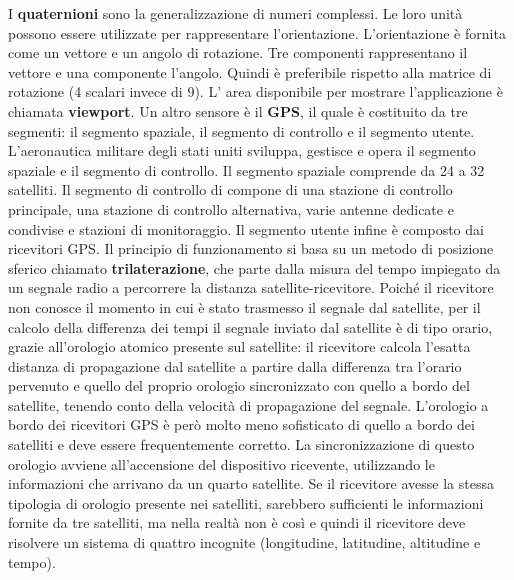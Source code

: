 I \textbf{quaternioni} sono la generalizzazione di numeri complessi. Le loro unità possono essere utilizzate per rappresentare l'orientazione. L'orientazione è fornita come un vettore e un angolo di rotazione. Tre componenti rappresentano il vettore e una componente l'angolo. Quindi è preferibile rispetto alla matrice di rotazione (4 scalari invece di 9). L' area disponibile per mostrare l'applicazione è chiamata \textbf{viewport}.
Un altro sensore è il \textbf{GPS}, il quale è costituito da tre segmenti: il segmento spaziale, il segmento di controllo e il segmento utente. L'aeronautica militare degli stati uniti sviluppa, gestisce e opera il segmento spaziale e il segmento di controllo. Il segmento spaziale comprende da 24 a 32 satelliti. Il segmento di controllo di compone di una stazione di controllo principale, una stazione di controllo alternativa, varie antenne dedicate e condivise e stazioni di monitoraggio. Il segmento utente infine è composto dai ricevitori GPS. Il principio di funzionamento si basa su un metodo di posizione sferico chiamato \textbf{trilaterazione}, che parte dalla misura del tempo impiegato da un segnale radio a percorrere la distanza satellite-ricevitore. Poiché il ricevitore non conosce il momento in cui è stato trasmesso il segnale dal satellite, per il calcolo della differenza dei tempi il segnale inviato dal satellite è di tipo orario, grazie all'orologio atomico presente sul satellite: il ricevitore calcola l'esatta distanza di propagazione dal satellite a partire dalla differenza tra l'orario pervenuto e quello del proprio orologio sincronizzato con quello a bordo del satellite, tenendo conto della velocità di propagazione del segnale. L'orologio a bordo dei ricevitori GPS è però molto meno sofisticato di quello a bordo dei satelliti e deve essere frequentemente corretto. La sincronizzazione di questo orologio avviene all'accensione del dispositivo ricevente, utilizzando le informazioni che arrivano da un quarto satellite. Se il ricevitore avesse la stessa tipologia di orologio presente nei satelliti, sarebbero sufficienti le informazioni fornite da tre satelliti, ma nella realtà non è così e quindi il ricevitore deve risolvere un sistema di quattro incognite (longitudine, latitudine, altitudine e tempo).
